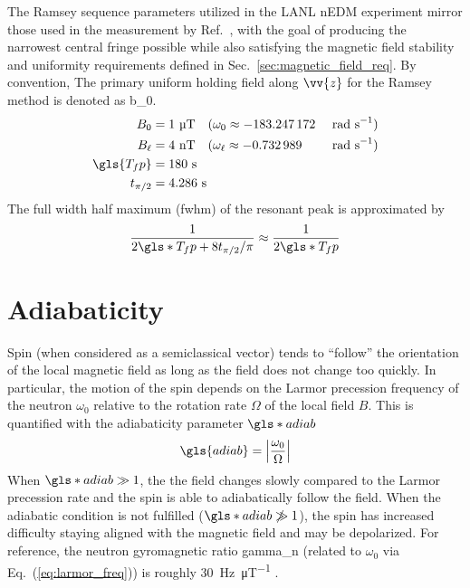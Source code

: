 The Ramsey sequence parameters utilized in the LANL nEDM experiment mirror those used in the measurement by Ref.~\cite{ABE20}, with the goal of producing the narrowest central fringe possible while also satisfying the magnetic field stability and uniformity requirements defined in Sec.~\ref{sec:magnetic_field_req}. By convention, The primary uniform holding field along $\vv{z}$ for the Ramsey method is denoted as \gls*{b_0}.
%
\begin{alignat}{3}
    B_0 &= 1\text{ \textmu T} \quad (\omega_0 \approx -183.247\,172 &&\text{ rad s}^{-1} ) \\
    B_\ell &= 4 \text{ nT} \quad (\omega_\ell \approx -0.732\,989 &&\text{ rad s}^{-1} ) \\
    \gls{T_fp} &= 180\text{ s} \\
    t_{\pi/2} &= 4.286\text{ s}
\end{alignat}
%
The full width half maximum (\acrshort*{fwhm}) of the resonant peak is approximated by~\cite{may_thesis, pendlebury_revised_2015}
%
\begin{gather}
    \frac{1}{2 \gls*{T_fp}+8 t_{\pi/2} / \pi} \approx \frac{1}{2\gls*{T_fp}}
\end{gather}


\section{Adiabaticity}\label{sec:adiabaticity}


Spin (when considered as a semiclassical vector) tends to ``follow'' the orientation of the local magnetic field as long as the field does not change too quickly. In particular, the motion of the spin depends on the Larmor precession frequency of the neutron $\omega_0$ relative to the rotation rate $\Omega$ of the local field $B$. This is quantified with the adiabaticity parameter $\gls*{adiab}$ \cite{abragam1961principles}
%
\begin{gather}
    \gls{adiab}=\left| \frac{\omega_0}{\Omega} \right| \label{eq:adiab}
\end{gather}
%
When $\gls*{adiab}\gg 1$, the the field changes slowly compared to the Larmor precession rate and the spin is able to adiabatically follow the field. When the adiabatic condition is not fulfilled ($\gls*{adiab}\not\gg 1$), the spin has increased difficulty staying aligned with the magnetic field and may be depolarized. For reference, the neutron gyromagnetic ratio \gls{gamma_n} (related to $\omega_0$ via Eq.~(\ref{eq:larmor_freq})) is roughly \qty{30}{\hertz.\micro\tesla^{-1}} \cite{codata_2018}.

